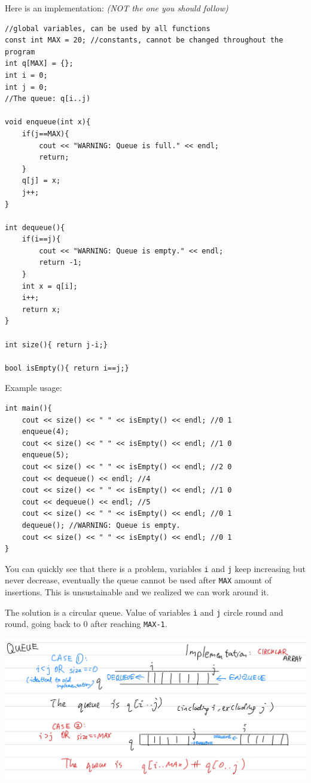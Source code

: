 Here is an implementation: \textit{(NOT the one you should follow)}

\begin{lstlisting}
//global variables, can be used by all functions
const int MAX = 20; //constants, cannot be changed throughout the program
int q[MAX] = {};
int i = 0;
int j = 0;
//The queue: q[i..j)

void enqueue(int x){
    if(j==MAX){
        cout << "WARNING: Queue is full." << endl;
        return;
    }
    q[j] = x;
    j++;
}

int dequeue(){
    if(i==j){
        cout << "WARNING: Queue is empty." << endl;
        return -1;
    }
    int x = q[i];
    i++;
    return x;
}

int size(){ return j-i;}

bool isEmpty(){ return i==j;}
\end{lstlisting}

Example usage:

\begin{lstlisting}
int main(){
    cout << size() << " " << isEmpty() << endl; //0 1
    enqueue(4);
    cout << size() << " " << isEmpty() << endl; //1 0
    enqueue(5);
    cout << size() << " " << isEmpty() << endl; //2 0
    cout << dequeue() << endl; //4
    cout << size() << " " << isEmpty() << endl; //1 0
    cout << dequeue() << endl; //5
    cout << size() << " " << isEmpty() << endl; //0 1
    dequeue(); //WARNING: Queue is empty.
    cout << size() << " " << isEmpty() << endl; //0 1
}
\end{lstlisting}

You can quickly see that there is a problem, variables \texttt{i} and \texttt{j} keep increasing but never decrease, eventually the queue cannot be used after \texttt{MAX} amount of insertions. This is unsustainable and we realized we can work around it.

The solution is a circular queue. Value of variables \texttt{i} and \texttt{j} circle round and round, going back to 0 after reaching \texttt{MAX-1}.

\includegraphics[width=14cm]{images/ch6-cq.png}

